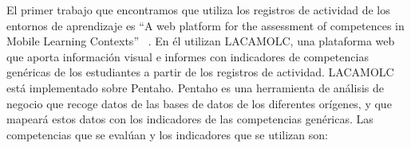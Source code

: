 
El primer trabajo que encontramos que utiliza los registros de actividad de los entornos de aprendizaje es “A web platform for the assessment of competences in Mobile Learning Contexts” ~\cite{rayon2014web}. En él utilizan LACAMOLC, una plataforma web que aporta información visual e informes con indicadores de competencias genéricas de los estudiantes a partir de los registros de actividad. LACAMOLC está implementado sobre Pentaho. Pentaho es una herramienta de análisis de negocio que recoge datos de las bases de datos de los diferentes orígenes, y que mapeará estos datos con los indicadores de las competencias genéricas. Las competencias que se evalúan y los indicadores que se utilizan son:

